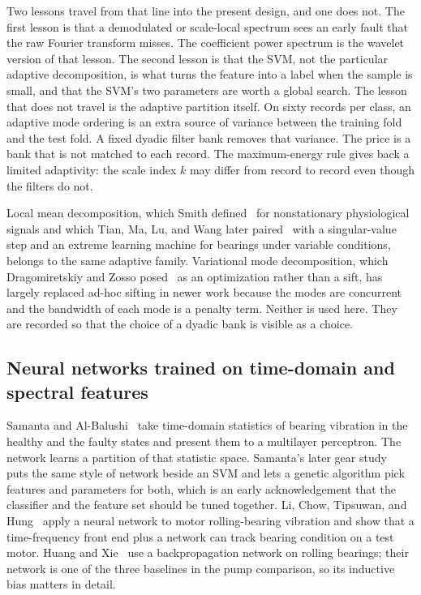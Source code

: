 Two lessons travel from that line into the present design, and one does not.
The first lesson is that a demodulated or scale-local spectrum sees an early fault that the raw Fourier transform misses.
The coefficient power spectrum is the wavelet version of that lesson.
The second lesson is that the SVM, not the particular adaptive decomposition, is what turns the feature into a label when the sample is small, and that the SVM's two parameters are worth a global search.
The lesson that does not travel is the adaptive partition itself.
On sixty records per class, an adaptive mode ordering is an extra source of variance between the training fold and the test fold.
A fixed dyadic filter bank removes that variance.
The price is a bank that is not matched to each record.
The maximum-energy rule gives back a limited adaptivity: the scale index \(k\) may differ from record to record even though the filters do not.

Local mean decomposition, which Smith defined~\cite{smith2005} for nonstationary physiological signals and which Tian, Ma, Lu, and Wang later paired~\cite{tian2015} with a singular-value step and an extreme learning machine for bearings under variable conditions, belongs to the same adaptive family.
Variational mode decomposition, which Dragomiretskiy and Zosso posed~\cite{dragomiretskiy2014} as an optimization rather than a sift, has largely replaced ad-hoc sifting in newer work because the modes are concurrent and the bandwidth of each mode is a penalty term.
Neither is used here.
They are recorded so that the choice of a dyadic bank is visible as a choice.

\subsection{Neural networks trained on time-domain and spectral features}

Samanta and Al-Balushi~\cite{samanta2003} take time-domain statistics of bearing vibration in the healthy and the faulty states and present them to a multilayer perceptron.
The network learns a partition of that statistic space.
Samanta's later gear study~\cite{samanta2004} puts the same style of network beside an SVM and lets a genetic algorithm pick features and parameters for both, which is an early acknowledgement that the classifier and the feature set should be tuned together.
Li, Chow, Tipsuwan, and Hung~\cite{li2000} apply a neural network to motor rolling-bearing vibration and show that a time-frequency front end plus a network can track bearing condition on a test motor.
Huang and Xie~\cite{huang2009} use a backpropagation network on rolling bearings; their network is one of the three baselines in the pump comparison, so its inductive bias matters in detail.

